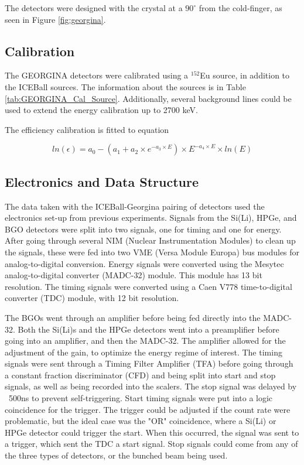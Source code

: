 The detectors were designed with the crystal at a $90^{\circ}$ from the cold-finger, as seen in Figure \ref{fig:georgina}.





\subsection{Calibration}

The GEORGINA detectors were calibrated using a $^{152}$Eu source, in addition to the ICEBall sources. The information about the sources is in Table \ref{tab:GEORGINA_Cal_Source}. Additionally, several background lines could be used to extend the energy calibration up to 2700 keV. 



The efficiency calibration is fitted to equation

\begin{equation}
    ln(\epsilon) = a_0-(a_1+a_2\times e^{-a_3\times E})\times E^{-a_4\times E}\times ln(E)
    \label{eq:Ge_Eff}
\end{equation}

\subsection{Electronics and Data Structure}

The data taken with the ICEBall-Georgina pairing of detectors used the electronics set-up from previous experiments\citep{battaglia15:_iceball_176lu}. Signals from the Si(Li), HPGe, and BGO detectors were split into two signals, one for timing and one for energy. After going through several NIM (Nuclear Instrumentation Modules) to clean up the signals, these were fed into two VME (Versa Module Europa) bus modules for analog-to-digital conversion. Energy signals were converted using the Mesytec analog-to-digital converter (MADC-32) module. This module has 13 bit resolution. The timing signals were converted using a Caen V778 time-to-digital converter (TDC) module, with 12 bit resolution.

The BGOs went through an amplifier before being fed directly into the MADC-32. Both the Si(Li)s and the HPGe detectors went into a preamplifier before going into an amplifier, and then the MADC-32. The amplifier allowed for the adjustment of the gain, to optimize the energy regime of interest. The timing signals were sent through a Timing Filter Amplifier (TFA) before going through a constant fraction discriminator (CFD) and being split into start and stop signals, as well as being recorded into the scalers. The stop signal was delayed by ~500ns to prevent self-triggering. Start timing signals were put into a logic coincidence for the trigger. The trigger could be adjusted if the count rate were problematic, but the ideal case was the "OR" coincidence, where a Si(Li) or HPGe detector could trigger the start. When this occurred, the signal was sent to a trigger, which sent the TDC a start signal. Stop signals could come from any of the three types of detectors, or the bunched beam being used.

